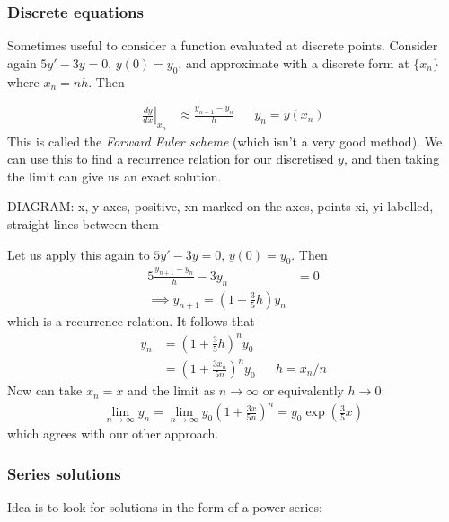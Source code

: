 \documentclass{../../template/note}
\begin{document}
    \subsubsection{Discrete equations}

    Sometimes useful to consider a function evaluated at discrete points. Consider again \(5y' - 3y = 0\), \(y(0) = y_0\), and approximate with a discrete form at \(\{x_n\}\) where \(x_n = nh\). Then

    \begin{align*}
        \left.\frac{dy}{dx}\right|_{x_n} &\approx \frac{y_{n+1}-y_n}{h} && y_n = y(x_n)
    \end{align*}
    This is called the \emph{Forward Euler scheme} (which isn't a very good method). We can use this to find a recurrence relation for our discretised \(y\), and then taking the limit can give us an exact solution.

    DIAGRAM: x, y axes, positive, xn marked on the axes, points xi, yi labelled, straight lines between them

    \begin{example}
        Let us apply this again to \(5y'-3y=0\), \(y(0) = y_0\). 
        Then
        \begin{align*}
            5 \frac{y_{n+1}-y_n}{h} - 3y_n &= 0 \\
            \implies y_{n+1} = \left(1 + \frac{3}{5}h\right)y_n
        \end{align*}
        which is a recurrence relation. It follows that
        \begin{align*}
            y_n &= \left(1 + \frac{3}{5}h\right)^n y_0 \\
            &= \left(1 + \frac{3x_n}{5n}\right)^n y_0 && h = x_n/n
        \end{align*}
        Now can take \(x_n = x\) and the limit as \(n \to \infty\) or equivalently \(h \to 0\):
        \begin{align*}
            \lim_{n \to \infty} y_n = \lim_{n \to \infty} y_0 \left( 1 + \frac{3x}{5n} \right)^n = y_0 \exp\left(\frac{3}{5}x\right)
        \end{align*}
        which agrees with our other approach.
    \end{example}
    
    
    \subsubsection{Series solutions}

    Idea is to look for solutions in the form of a power series:
\end{document}
